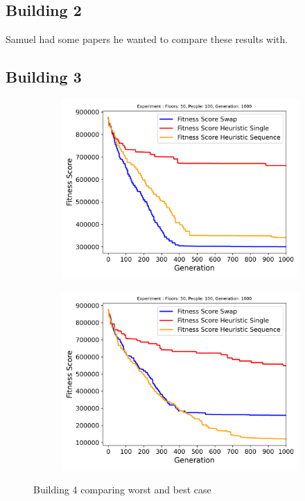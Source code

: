 \subsection{Building 2}
Samuel had some papers he wanted to compare these results with.

\subsection{Building 3}
\begin{figure}[h]
	\centering
	\begin{subfigure}[b]{0.49\linewidth}
		\centering
		\includegraphics[width=\linewidth]{results/Building3/Mutation_0.1/Floors: 50, People: 100, Generation: 1000_4_worst.png}
		\label{fig:Building3/Mutation_0.1/Floors: 50, People: 100, Generation: 1000_4_worst}
	\end{subfigure}
	\hfill
	\begin{subfigure}[b]{0.49\linewidth}
		\centering
		\includegraphics[width=\linewidth]{results/Building3/Mutation_0.1/Floors: 50, People: 100, Generation: 1000_1_best.png}
		\label{fig:Building3/Mutation_0.1/Floors: 50, People: 100, Generation: 1000_1_best}
	\end{subfigure}
	\hfill
	\caption{Building 4 comparing worst and best case}
	\label{fig:Building 3 comparing worst and best case}
\end{figure}

